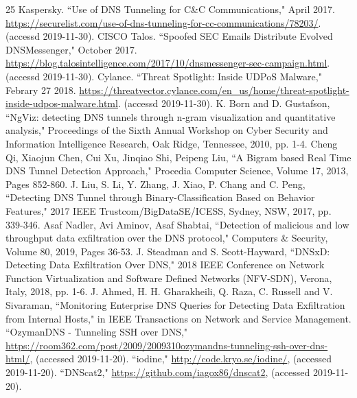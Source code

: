 \documentclass[12pt]{jarticle} %
\begin{document}
\begin{thebibliography} {25}
  Kaspersky. ``Use of DNS Tunneling for C\&C Communications," April 2017. \href{https://securelist.com/use-of-dns-tunneling-for-cc-communications/78203/}{https://securelist.com/use-of-dns-tunneling-for-cc-communications/78203/}. (accessd 2019-11-30).
  CISCO Talos. ``Spoofed SEC Emails Distribute Evolved DNSMessenger," October 2017. \href{https://blog.talosintelligence.com/2017/10/dnsmessenger-sec-campaign.html}{https://blog.talosintelligence.com/2017/10/dnsmessenger-sec-campaign.html}. (accessd 2019-11-30).
  Cylance. ``Threat Spotlight: Inside UDPoS Malware," Febrary 27 2018. \href{https://threatvector.cylance.com/en\_us/home/threat-spotlight-inside-udpos-malware.html}{https://threatvector.cylance.com/en\_us/home/threat-spotlight-inside-udpos-malware.html}. (accessd 2019-11-30).
  K. Born and D. Gustafson, ``NgViz: detecting DNS tunnels through n-gram visualization and quantitative analysis," Proceedings of the Sixth Annual Workshop on Cyber Security and Information Intelligence Research, Oak Ridge, Tennessee, 2010, pp. 1-4.
  Cheng Qi, Xiaojun Chen, Cui Xu, Jinqiao Shi, Peipeng Liu, ``A Bigram based Real Time DNS Tunnel Detection Approach," Procedia Computer Science, Volume 17, 2013, Pages 852-860.
  J. Liu, S. Li, Y. Zhang, J. Xiao, P. Chang and C. Peng, ``Detecting DNS Tunnel through Binary-Classification Based on Behavior Features," 2017 IEEE Trustcom/BigDataSE/ICESS, Sydney, NSW, 2017, pp. 339-346.
  Asaf Nadler, Avi Aminov, Asaf Shabtai, ``Detection of malicious and low throughput data exfiltration over the DNS protocol," Computers \& Security, Volume 80, 2019, Pages 36-53.
  J. Steadman and S. Scott-Hayward, ``DNSxD: Detecting Data Exfiltration Over DNS," 2018 IEEE Conference on Network Function Virtualization and Software Defined Networks (NFV-SDN), Verona, Italy, 2018, pp. 1-6.
  J. Ahmed, H. H. Gharakheili, Q. Raza, C. Russell and V. Sivaraman, ``Monitoring Enterprise DNS Queries for Detecting Data Exfiltration from Internal Hosts," in IEEE Transactions on Network and Service Management.
  ``OzymanDNS - Tunneling SSH over DNS," \href{https://room362.com/post/2009/2009310ozymandns-tunneling-ssh-over-dns-html/}{https://room362.com/post/2009/2009310ozymandns-tunneling-ssh-over-dns-html/}, (accessed 2019-11-20).
  ``iodine," \href{http://code.kryo.se/iodine/}{http://code.kryo.se/iodine/}, (accessed 2019-11-20).
  ``DNScat2," \href{https://github.com/iagox86/dnscat2}{https://github.com/iagox86/dnscat2}, (accessed 2019-11-20).

\end{thebibliography}
\end{document}
